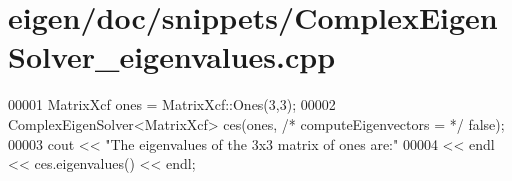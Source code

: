 \hypertarget{eigen_2doc_2snippets_2_complex_eigen_solver__eigenvalues_8cpp_source}{}\section{eigen/doc/snippets/\+Complex\+Eigen\+Solver\+\_\+eigenvalues.cpp}
\label{eigen_2doc_2snippets_2_complex_eigen_solver__eigenvalues_8cpp_source}

\begin{DoxyCode}
00001 MatrixXcf ones = MatrixXcf::Ones(3,3);
00002 ComplexEigenSolver<MatrixXcf> ces(ones, \textcolor{comment}{/* computeEigenvectors = */} \textcolor{keyword}{false});
00003 cout << \textcolor{stringliteral}{"The eigenvalues of the 3x3 matrix of ones are:"} 
00004      << endl << ces.eigenvalues() << endl;
\end{DoxyCode}
